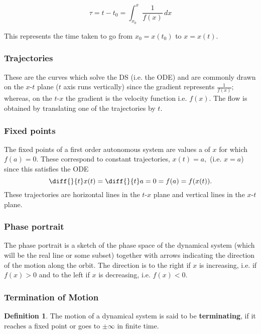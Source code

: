 \documentclass[12pt, a4paper]{article}
\newcommand{\f}[2]{\frac{#1}{#2}}
\theoremstyle{definition}
\newtheorem{definition}{Definition}[section]
\theoremstyle{plain}
\begin{document}
\begin{tcolorbox}
$$\tau=t-t_0=\int_{x_0}^{x} \f{1}{f(x)}\,dx$$
\end{tcolorbox}

This represents the time taken to go from $x_0 = x(t_0)$ to $x = x(t).$ 

\subsubsection*{Trajectories}

These are the curves which solve the DS (i.e. the ODE) and are commonly drawn on the $x$-$t$ plane ($t$ axis runs vertically) since the gradient represents $\f{1}{f(x)};$ whereas, on the $t$-$x$ the gradient is the velocity function i.e. $f(x).$ The flow is obtained by translating one of the trajectories by $t.$

\subsubsection*{Fixed points}

The fixed points of a first order autonomous system are values a of $x$ for which $f(a) = 0.$ These correspond to constant trajectories, $x(t) = a,$ (i.e. $x=a$) since this satisfies the ODE $$\diff{}{t}x(t)=\diff{}{t}a=0=f(a)=f(x(t)).$$
These trajectories are horizontal lines in the $t$-$x$ plane and vertical lines in the $x$-$t$ plane.

\subsubsection*{Phase portrait}

The phase portrait is a sketch of the phase space of the dynamical system (which will be the real line or some subset) together with arrows indicating the direction of the motion along the orbit. The direction is to the right if $x$ is increasing, i.e. if $f(x) > 0$ and to the left if $x$ is decreasing, i.e. $f(x) < 0.$



\subsubsection{Termination of Motion}

\begin{definition}
The motion of a dynamical system is said to be \textbf{terminating}, if it reaches a fixed point or goes to $\pm\infty$ in finite time.
\end{definition}
\end{document}
